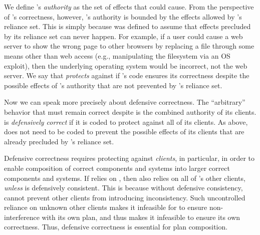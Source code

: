 \documentclass{llncs}
\begin{document}
We define 's \emph{authority} as the set of effects that
 could cause.  From the perspective of 's correctness,
however, 's authority is bounded by the effects allowed by
's reliance set.  This is simply because  was defined
to assume that effects precluded by its reliance set can never
happen. For example, if a user could cause a web server to show the
wrong page to other browsers by replacing a file through some means
other than web access (e.g., manipulating the filesystem via an OS
exploit), then the underlying operating system would be incorrect, not
the web server.  We say that  \emph{protects} against 
if 's code ensures its correctness despite the possible
effects of 's authority that are not prevented by 's
reliance set.


Now we can speak more precisely about defensive correctness.  The
``arbitrary'' behavior that  must remain correct despite is
the combined authority of its clients.   is \emph{defensively
correct} if it is coded to protect against all of its clients. As
above,  does not need to be coded to prevent the possible
effects of its clients that are already precluded by 's
reliance set.


Defensive correctness requires protecting against \emph{clients}, in
particular, in order to enable composition of correct components and
systems into larger correct components and systems. If  relies
on , then  also relies on all of 's other
clients, \emph{unless}  is defensively consistent. This is
because without defensive consistency,  cannot prevent other
clients from introducing inconsistency.  Such uncontrolled reliance on
unknown other clients makes it infeasible for  to ensure
non-interference with its own plan, and thus makes it infeasible to
ensure its own correctness.  Thus, defensive correctness is essential
for plan composition.
\end{document}
